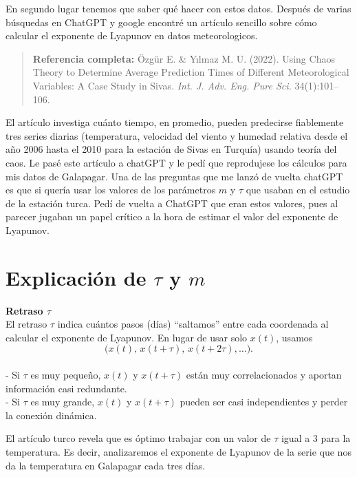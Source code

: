 \documentclass[
  11pt,
  a4paper,
  DIV=11,
  numbers=noendperiod]{scrreprt}
\begin{document}
En segundo lugar tenemos que saber qué hacer con estos datos. Después de
varias búsquedas en ChatGPT y google encontré un artículo sencillo sobre
cómo calcular el exponente de Lyapunov en datos meteorologicos.

\begin{quote}
\textbf{Referencia completa:} Özgür E. \& Yılmaz M. U. (2022). Using
Chaos Theory to Determine Average Prediction Times of Different
Meteorological Variables: A Case Study in Sivas. \emph{Int. J. Adv. Eng.
Pure Sci.} 34(1):101--106.
\end{quote}

El artículo investiga cuánto tiempo, en promedio, pueden predecirse
fiablemente tres series diarias (temperatura, velocidad del viento y
humedad relativa desde el año 2006 hasta el 2010 para la estación de
Sivas en Turquía) usando teoría del caos. Le pasé este artículo a
chatGPT y le pedí que reprodujese los cálculos para mis datos de
Galapagar. Una de las preguntas que me lanzó de vuelta chatGPT es que si
quería usar los valores de los parámetros \(m\) y \(\tau\) que usaban en
el estudio de la estación turca. Pedí de vuelta a ChatGPT que eran estos
valores, pues al parecer jugaban un papel crítico a la hora de estimar
el valor del exponente de Lyapunov.

\section{\texorpdfstring{Explicación de \(\tau\) y
\(m\)}{Explicación de \textbackslash tau y m}}\label{explicaciuxf3n-de-tau-y-m}

\textbf{Retraso \(\tau\)}\\
El retraso \(\tau\) indica cuántos pasos (días) ``saltamos'' entre cada
coordenada al calcular el exponente de Lyapunov. En lugar de usar solo
\(x(t)\), usamos\\
\[
\bigl(x(t),\,x(t+\tau),\,x(t+2\tau),\dots\bigr).
\]\\
- Si \(\tau\) es muy pequeño, \(x(t)\) y \(x(t+\tau)\) están muy
correlacionados y aportan información casi redundante.\\
- Si \(\tau\) es muy grande, \(x(t)\) y \(x(t+\tau)\) pueden ser casi
independientes y perder la conexión dinámica.

El artículo turco revela que es óptimo trabajar con un valor de \(\tau\)
igual a 3 para la temperatura. Es decir, analizaremos el exponente de
Lyapunov de la serie que nos da la temperatura en Galapagar cada tres
días.
\end{document}
